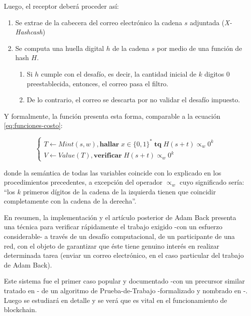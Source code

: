 Luego, el receptor deberá proceder así:

\begin{enumerate}
  \item Se extrae de la cabecera del correo electrónico la cadena $s$ adjuntada (\textit{X-Hashcash})
  \item Se computa una huella digital $h$ de la cadena $s$ por medio de una función de hash $H$.
  \begin{enumerate}
    \item Si $h$ cumple con el desafío, es decir, la cantidad inicial de $k$ digitos 0 preestablecida, entonces, el correo pasa el filtro.
    \item De lo contrario, el correo se descarta por no validar el desafío impuesto.
  \end{enumerate}
\end{enumerate}

Y formalmente, la función presenta esta forma, comparable a la ecuación \ref{eq:funciones-costo}:

\begin{equation}
  \begin{cases*}
    T \leftarrow Mint(s, w), \mathbf{hallar}\; x \in \{0, 1\}^*\; \mathbf{tq}\; H(s+t) \propto_w 0^k \\
    V \leftarrow Value(T),  \mathbf{verificar}\; H(s+t) \propto_w 0^k
  \end{cases*}
\end{equation}

donde la semántica de todas las variables coincide con lo explicado en los procedimientos precedentes, a excepción del operador $\propto_w$ cuyo significado sería: ``los $k$ primeros dígitos de la cadena de la izquierda tienen que coincidir completamente con la cadena de la derecha''.

En resumen, la implementación y el artículo posterior de Adam Back presenta una técnica para verificar rápidamente el trabajo exigido -con un esfuerzo considerable- a través de un desafío computacional, de un participante de una red, con el objeto de garantizar que éste tiene genuino interés en realizar determinada tarea (enviar un correo electrónico, en el caso particular del trabajo de Adam Back).

Este sistema fue el primer caso popular y documentado -con un precursor similar tratado en \cite{Dwork1992}- de un algoritmo de Prueba-de-Trabajo -formalizado y nombrado en \cite{Jakobsson1999}-. Luego se estudiará en detalle y se verá que es vital en el funcionamiento de blockchain.

